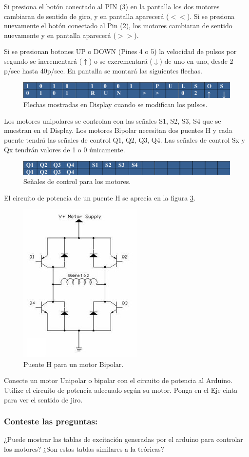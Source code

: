 Si presiona el botón conectado al PIN (3) en la pantalla los dos motores cambiaran de sentido de giro, y en pantalla aparecerá ($<<$). Si se presiona nuevamente el botón conectado al Pin (2), los motores cambiaran de sentido nuevamente y en pantalla aparecerá ($>>$).

Si se presionan botones UP o DOWN (Pines 4 o 5) la velocidad de pulsos por segundo se incrementará ($\uparrow$) o se excrementará ($\downarrow$) de uno en uno, desde 2 p/sec hasta 40p/sec. En pantalla se montará las siguientes flechas.
\begin{figure}[H]
	\centering
	\includegraphics[width=0.7\linewidth]{fig/Fig5}
	\caption{Flechas mostradas en Display cuando se modifican los pulsos. }
	\label{fig:fig5}
\end{figure}
Los motores unipolares se controlan con las señales S1, S2, S3, S4 que se muestran en el Display. Los motores Bipolar necesitan dos puentes H y cada puente tendrá las señales de control Q1, Q2, Q3, Q4.  Las señales de control Sx y Qx tendrán valores de 1 o 0 únicamente.

\begin{figure}[H]
	\centering
	\includegraphics[width=0.7\linewidth]{fig/Fig6}
	\caption{Señales de control para los motores.}
	\label{fig:fig6}
\end{figure}

El circuito de potencia de un puente H se aprecia en la figura \ref{fig:puenteh}.
\begin{figure}[H]
	\centering
	\includegraphics[width=0.4\linewidth]{fig/PuenteH}
	\caption{Puente H para un motor Bipolar.}
	\label{fig:puenteh}
\end{figure}

Conecte un motor Unipolar o bipolar con el circuito de potencia al Arduino. Utilize el circuito de potencia adecuado según su motor. Ponga en el Eje cinta para ver el sentido de jiro.

\subsubsection{Conteste las preguntas:} 

¿Puede mostrar las tablas de excitación generadas por el arduino para controlar los motores?
¿Son estas tablas similares a la teóricas?